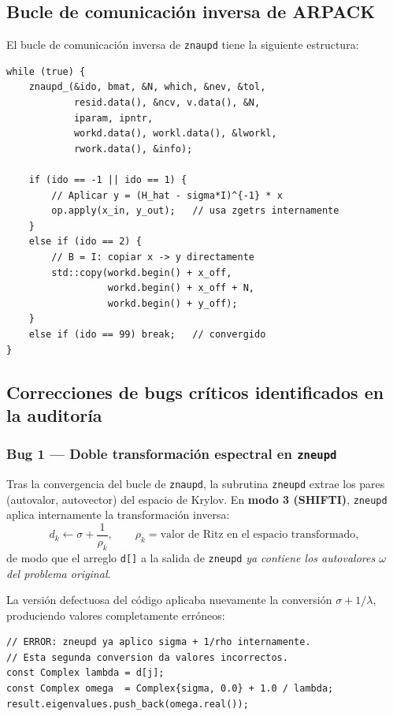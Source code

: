 \documentclass[12pt,a4paper]{article}
\begin{document}
\subsection{Bucle de comunicación inversa de ARPACK}

El bucle de comunicación inversa de \texttt{znaupd} tiene la siguiente
estructura:

\begin{lstlisting}[style=cpp, caption={Bucle principal ARPACK en \texttt{eigensolver.cpp}}]
while (true) {
    znaupd_(&ido, bmat, &N, which, &nev, &tol,
            resid.data(), &ncv, v.data(), &N,
            iparam, ipntr,
            workd.data(), workl.data(), &lworkl,
            rwork.data(), &info);

    if (ido == -1 || ido == 1) {
        // Aplicar y = (H_hat - sigma*I)^{-1} * x
        op.apply(x_in, y_out);   // usa zgetrs internamente
    }
    else if (ido == 2) {
        // B = I: copiar x -> y directamente
        std::copy(workd.begin() + x_off,
                  workd.begin() + x_off + N,
                  workd.begin() + y_off);
    }
    else if (ido == 99) break;   // convergido
}
\end{lstlisting}

\subsection{Correcciones de bugs críticos identificados en la auditoría}

\label{sec:bugs}

\subsubsection{Bug 1 --- Doble transformación espectral en \texttt{zneupd}}

Tras la convergencia del bucle de \texttt{znaupd}, la subrutina
\texttt{zneupd} extrae los pares (autovalor, autovector) del espacio
de Krylov.
En \textbf{modo 3 (SHIFTI)}, \texttt{zneupd} aplica internamente la
transformación inversa:
\begin{equation}
  d_k \leftarrow \sigma + \frac{1}{\rho_k},
  \qquad \rho_k = \text{valor de Ritz en el espacio transformado},
  \label{eq:zneupd_backtransform}
\end{equation}
de modo que el arreglo \texttt{d[]} a la salida de \texttt{zneupd}
\emph{ya contiene los autovalores $\omega$ del problema original}.

La versión defectuosa del código aplicaba nuevamente la conversión
$\sigma + 1/\lambda$, produciendo valores completamente erróneos:
\begin{lstlisting}[style=cpp, caption={Código defectuoso (ELIMINADO)}]
// ERROR: zneupd ya aplico sigma + 1/rho internamente.
// Esta segunda conversion da valores incorrectos.
const Complex lambda = d[j];
const Complex omega  = Complex{sigma, 0.0} + 1.0 / lambda;
result.eigenvalues.push_back(omega.real());
\end{lstlisting}
\end{document}
